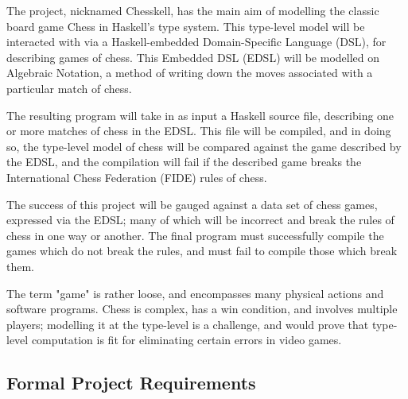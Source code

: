 \documentclass[12pt, a4paper]{scrartcl}
\begin{document}
The project, nicknamed Chesskell, has the main aim of modelling the classic board game Chess in Haskell's type system. This type-level model will be interacted with via a Haskell-embedded Domain-Specific Language (DSL), for describing games of chess. This Embedded DSL (EDSL) will be modelled on Algebraic Notation, a method of writing down the moves associated with a particular match of chess.

The resulting program will take in as input a Haskell source file, describing one or more matches of chess in the EDSL. This file will be compiled, and in doing so, the type-level model of chess will be compared against the game described by the EDSL, and the compilation will fail if the described game breaks the International Chess Federation (FIDE) rules of chess.

The success of this project will be gauged against a data set of chess games, expressed via the EDSL; many of which will be incorrect and break the rules of chess in one way or another. The final program must successfully compile the games which do not break the rules, and must fail to compile those which break them.

The term "game" is rather loose, and encompasses many physical actions and software programs. Chess is complex, has a win condition, and involves multiple players; modelling it at the type-level is a challenge, and would prove that type-level computation is fit for eliminating certain errors in video games.


\subsection{Formal Project Requirements}
\end{document}
